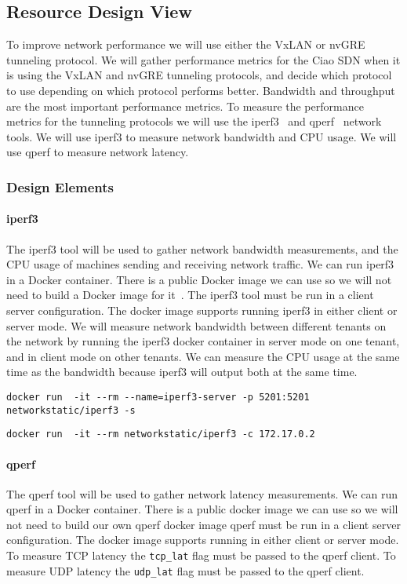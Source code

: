 \documentclass[10pt,onecolumn,journal,draftclsnofoot]{IEEEtran}
\begin{document}
\subsection{Resource Design View}
To improve network performance we will use either the VxLAN or nvGRE tunneling 
protocol.
We will gather performance metrics for the Ciao SDN when it is using the VxLAN 
and nvGRE tunneling protocols, and decide which protocol to use depending on 
which protocol performs better. Bandwidth and throughput are the most important 
performance metrics.
To measure the performance metrics for the tunneling protocols we will use 
the iperf3~\cite{iperf} and qperf~\cite{qperf} network tools.
We will use iperf3 to measure network bandwidth and 
CPU usage. We will use qperf to measure network latency.

\subsubsection{Design Elements}
\paragraph{iperf3}
The iperf3 tool will be used to gather network bandwidth measurements, and the
CPU usage of machines sending and receiving network traffic.
We can run iperf3 in a Docker container. 
There is a public Docker image we can use 
so we will not need to build a Docker image for it~\cite{iperfdocker}.
The iperf3 tool must be run in a client server configuration.
The docker image supports running iperf3 in either client or server mode.
We will measure network bandwidth between different tenants on the network 
by running the iperf3 docker container in server mode on one tenant, and in 
client mode on other tenants.
We can measure the CPU usage at the same time as the bandwidth because iperf3
will output both at the same time.

\begin{lstlisting}[caption = Running an iperf3 docker container in server mode]
docker run  -it --rm --name=iperf3-server -p 5201:5201 networkstatic/iperf3 -s
\end{lstlisting}

\begin{lstlisting}[caption = Running an iperf3 docker container in client mode]
docker run  -it --rm networkstatic/iperf3 -c 172.17.0.2
\end{lstlisting}

\paragraph{qperf}
The qperf tool will be used to gather network latency measurements.
We can run qperf in a Docker container. There is a public docker image we can 
use so we will not need to build our own qperf docker image 
qperf must be run in a client server configuration. The docker image supports 
running in either client or server mode.
To measure TCP latency the \texttt{tcp\_lat} flag must be passed to the qperf 
client.
To measure UDP latency the \texttt{udp\_lat} flag must be passed to the qperf 
client.
\end{document}
